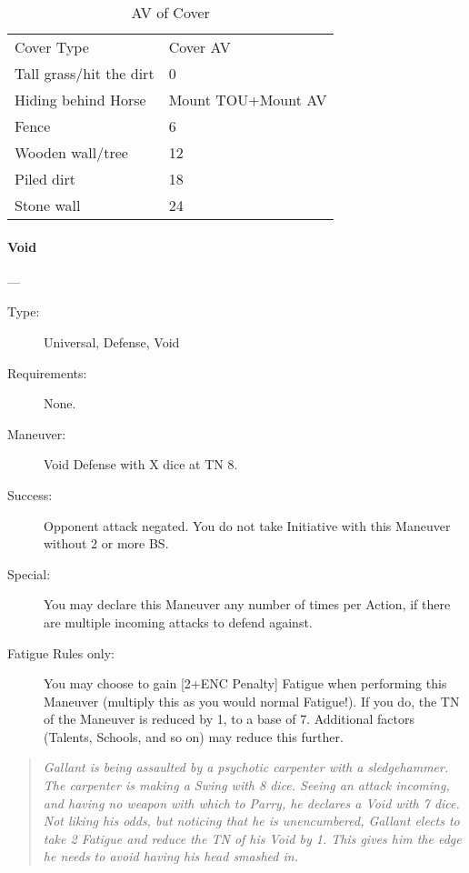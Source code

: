 \documentclass[oneside,11pt,english]{book}
\begin{document}
\begin{table}[!ht]
  \centering
  \caption{AV of Cover}
  \label{tab:Cover AV}
  \begin{tabu} spread 0pt{XX}
    Cover Type& Cover AV\\
    Tall grass/hit the dirt& 0\\
    Hiding behind Horse& Mount TOU+Mount AV\\
    Fence& 6\\
    Wooden wall/tree& 12\\
    Piled dirt& 18\\
    Stone wall& 24\\
  \end{tabu}
\end{table}

\paragraph{\large\label{man:Void}Void}---
\vspace{-10pt}\begin{description} 
\item [Type:] Universal, Defense, Void 
\item [Requirements:] None. 
\item [Maneuver:] Void Defense with X dice at TN 8. 
\item [Success:] Opponent attack negated. You do not take Initiative with this Maneuver without 2 or more BS. 
\item [Special:] You may declare this Maneuver any number of times per Action, if there are multiple incoming 
  attacks to defend against. 
\item [Fatigue Rules only:] You may choose to gain [2+ENC Penalty] Fatigue when performing this Maneuver 
  (multiply this as you would normal Fatigue!). If you do, the TN of the Maneuver is reduced by 1, to a 
  base of 7. Additional factors (Talents, Schools, and so on) may reduce this further. 
\end{description}
\begin{quotation}
  \emph{Gallant is being assaulted by a psychotic carpenter with a sledgehammer. The carpenter is making a Swing with 8 dice. Seeing 
    an attack incoming, and having no weapon with which to Parry, he declares a Void with 7 dice. Not liking his odds, but noticing 
    that he is unencumbered, Gallant elects to take 2 Fatigue and reduce the TN of his Void by 1. This gives him the edge he needs to 
    avoid having his head smashed in.}
\end{quotation}
\end{document}
